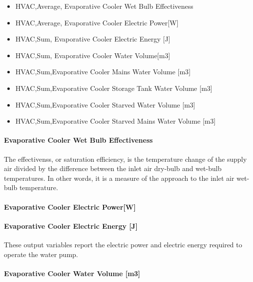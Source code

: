 \begin{itemize}
\item
  HVAC,Average, Evaporative Cooler Wet Bulb Effectiveness
\item
  HVAC,Average, Evaporative Cooler Electric Power{[}W{]}
\item
  HVAC,Sum, Evaporative Cooler Electric Energy {[}J{]}
\item
  HVAC,Sum, Evaporative Cooler Water Volume{[}m3{]}
\item
  HVAC,Sum,Evaporative Cooler Mains Water Volume {[}m3{]}
\item
  HVAC,Sum,Evaporative Cooler Storage Tank Water Volume {[}m3{]}
\item
  HVAC,Sum,Evaporative Cooler Starved Water Volume {[}m3{]}
\item
  HVAC,Sum,Evaporative Cooler Starved Mains Water Volume {[}m3{]}
\end{itemize}

\paragraph{Evaporative Cooler Wet Bulb Effectiveness}\label{evaporative-cooler-wet-bulb-effectiveness}

The effectivenss, or saturation efficiency, is the temperature change of the supply air divided by the difference between the inlet air dry-bulb and wet-bulb temperatures. In other words, it is a measure of the approach to the inlet air wet-bulb temperature.

\paragraph{Evaporative Cooler Electric Power{[}W{]}}\label{evaporative-cooler-electric-powerw}

\paragraph{Evaporative Cooler Electric Energy {[}J{]}}\label{evaporative-cooler-electric-energy-j}

These output variables report the electric power and electric energy required to operate the water pump.

\paragraph{Evaporative Cooler Water Volume {[}m3{]}}\label{evaporative-cooler-water-volume-m3}

